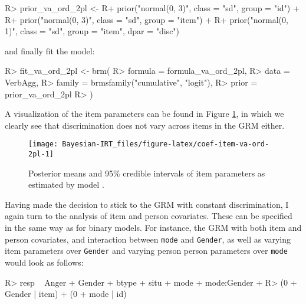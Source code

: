 \documentclass[jss]{jss}
\begin{document}
\begin{CodeChunk}

\begin{CodeInput}
R> prior_va_ord_2pl <- 
R+   prior("normal(0, 3)", class = "sd", group = "id") + 
R+   prior("normal(0, 3)", class = "sd", group = "item") +
R+   prior("normal(0, 1)", class = "sd", group = "item", dpar = "disc")
\end{CodeInput}
\end{CodeChunk}

and finally fit the model:

\begin{CodeChunk}

\begin{CodeInput}
R> fit_va_ord_2pl <- brm(
R>   formula = formula_va_ord_2pl,
R>   data = VerbAgg,
R>   family = brmsfamily("cumulative", "logit"),
R>   prior = prior_va_ord_2pl
R> )
\end{CodeInput}
\end{CodeChunk}

A visualization of the item parameters can be found in Figure
\ref{fig:coef-item-va-ord-2pl}, in which we clearly see that
discrimination does not vary across items in the GRM either.

\begin{CodeChunk}
\begin{figure}

{\centering \texttt{[image: Bayesian-IRT\_files/figure-latex/coef-item-va-ord-2pl-1]} 

}

\caption[Posterior means and 95\% credible intervals of item parameters as estimated by model ]{Posterior means and 95\% credible intervals of item parameters as estimated by model .}\label{fig:coef-item-va-ord-2pl}
\end{figure}
\end{CodeChunk}

Having made the decision to stick to the GRM with constant
discrimination, I again turn to the analysis of item and person
covariates. These can be specified in the same way as for binary models.
For instance, the GRM with both item and person covariates, and
interaction between \texttt{mode} and \texttt{Gender}, as well as
varying item parameters over \texttt{Gender} and varying person person
parameters over \texttt{mode} would look as follows:

\begin{CodeChunk}

\begin{CodeInput}
R> resp ~ Anger + Gender + btype + situ + mode + mode:Gender +
R>   (0 + Gender | item) + (0 + mode | id)
\end{CodeInput}
\end{CodeChunk}
\end{document}
